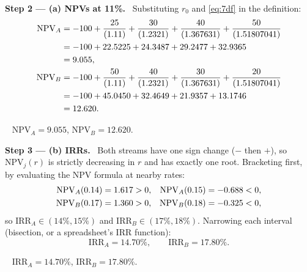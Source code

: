 \documentclass[11pt,a4paper]{article}
\numberwithin{equation}{section}
\newcommand{\step}[2]{\par\medskip\noindent\textbf{Step #1 --- #2.}~}
\newcommand{\answer}[1]{\par\smallskip\noindent\fbox{\textbf{Answer #1.}}~}
\begin{document}
\step{2}{(a) NPVs at 11\%} Substituting $r_0$ and \eqref{eq:7df} in the definition:
\begin{align}
  \mathrm{NPV}_A &= -100 + \frac{25}{(1.11)} + \frac{30}{(1.2321)} + \frac{40}{(1.367631)} + \frac{50}{(1.51807041)} \notag\\
                 &= -100 + 22.5225 + 24.3487 + 29.2477 + 32.9365 \notag\\
                 &= 9.055, \label{eq:7na}\\
  \mathrm{NPV}_B &= -100 + \frac{50}{(1.11)} + \frac{40}{(1.2321)} + \frac{30}{(1.367631)} + \frac{20}{(1.51807041)} \notag\\
                 &= -100 + 45.0450 + 32.4649 + 21.9357 + 13.1746 \notag\\
                 &= 12.620. \label{eq:7nb}
\end{align}

\answer{(a)} $\mathrm{NPV}_A=9.055$, $\mathrm{NPV}_B=12.620$.

\step{3}{(b) IRRs} Both streams have one sign change ($-$ then $+$), so $\mathrm{NPV}_j(r)$ is
strictly decreasing in $r$ and has exactly one root. Bracketing first, by evaluating the NPV
formula at nearby rates:
\begin{align}
  \mathrm{NPV}_A(0.14) &= 1.617 > 0, & \mathrm{NPV}_A(0.15) &= -0.688 < 0, \notag\\
  \mathrm{NPV}_B(0.17) &= 1.360 > 0, & \mathrm{NPV}_B(0.18) &= -0.325 < 0, \notag
\end{align}
so $\mathrm{IRR}_A\in(14\%,15\%)$ and $\mathrm{IRR}_B\in(17\%,18\%)$. Narrowing each interval
(bisection, or a spreadsheet's IRR function):
\begin{equation}\label{eq:7irr}
  \mathrm{IRR}_A = 14.70\%, \qquad \mathrm{IRR}_B = 17.80\%.
\end{equation}

\answer{(b)} $\mathrm{IRR}_A=14.70\%$, $\mathrm{IRR}_B=17.80\%$.
\end{document}
